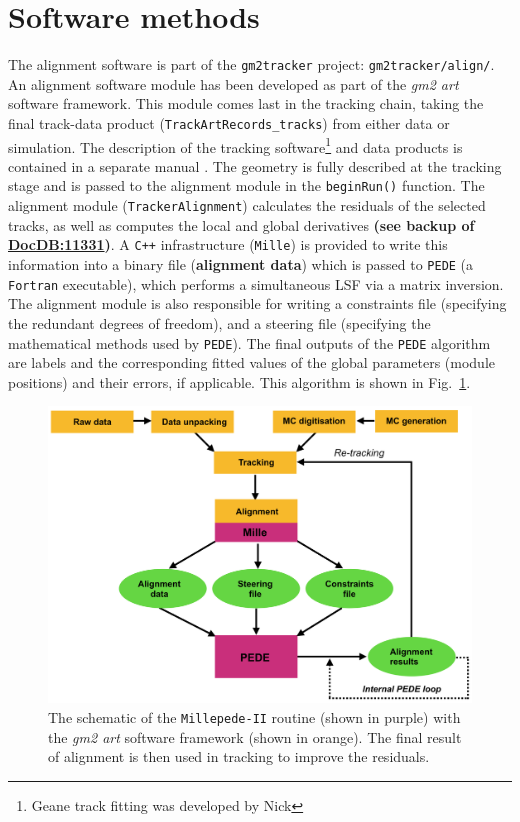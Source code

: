 \documentclass[12pt]{article}
\begin{document}
\section{Software methods}
The alignment software is part of the \verb!gm2tracker! project: \verb!gm2tracker/align/!. An alignment software module has been developed as part of the \textit{gm2 art} software framework. This module comes last in the tracking chain, taking the final track-data product (\verb!TrackArtRecords_tracks!) from either data or simulation. The description of the tracking software\footnote{Geane track fitting was developed by Nick} and data products is contained in a separate manual \cite{Nick}. The geometry is fully described at the tracking stage and is passed to the alignment module in the \verb!beginRun()! function. The alignment module (\verb!TrackerAlignment!) calculates the residuals of the selected tracks, as well as computes the local and global derivatives \textbf{(see backup of \href{https://gm2-docdb.fnal.gov/cgi-bin/private/ShowDocument?docid=11331}{DocDB:11331})}. A \verb!C++! infrastructure (\texttt{Mille}) is provided \cite{mp2} to write this information into a binary file (\textbf{alignment data}) which is passed to \texttt{PEDE} (a \texttt{Fortran} executable), which performs a simultaneous LSF via a matrix inversion. The alignment module is also responsible for writing a constraints file (specifying the redundant degrees of freedom), and a steering file (specifying the mathematical methods used by \texttt{PEDE}). The final outputs of the \texttt{PEDE} algorithm are labels and the corresponding fitted values of the global parameters (module positions) and their errors, if applicable. This algorithm is shown in Fig.~\ref{fig:mp2}.\\
\vspace{-0.5cm}
\begin{figure}[h!]
    \centering
    \includegraphics[scale = 0.40]{fig/MP2.png}
    \caption{The schematic of the \texttt{Millepede-II} routine (shown in purple) with the \textit{gm2 art} software framework (shown in orange). The final result of alignment is then used in tracking to improve the residuals.}
    \label{fig:mp2}
\end{figure}
\clearpage
\end{document}
